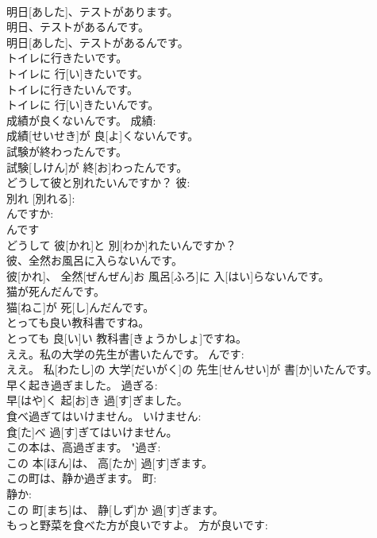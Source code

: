 \documentclass[8pt]{extreport}
\begin{document}
\begin{CJK}{UTF8}{min}
\\	明日[あした]、テストがあります。	
\\	明日、テストがあるんです。	
\\	明日[あした]、テストがあるんです。	
\\	トイレに行きたいです。	
\\	トイレに 行[い]きたいです。	
\\	トイレに行きたいんです。	
\\	トイレに 行[い]きたいんです。	
\\	成績が良くないんです。	成績: 
\\	成績[せいせき]が 良[よ]くないんです。	
\\	試験が終わったんです。	
\\	試験[しけん]が 終[お]わったんです。	
\\	どうして彼と別れたいんですか？	彼: 
\\	別れ [別れる]: 
\\	んですか: 
\\	んです 
\\	どうして 彼[かれ]と 別[わか]れたいんですか？	
\\	彼、全然お風呂に入らないんです。	
\\	彼[かれ]、 全然[ぜんぜん]お 風呂[ふろ]に 入[はい]らないんです。	
\\	猫が死んだんです。	
\\	猫[ねこ]が 死[し]んだんです。	
\\	とっても良い教科書ですね。	
\\	とっても 良[い]い 教科書[きょうかしょ]ですね。	
\\	ええ。私の大学の先生が書いたんです。	んです: 
\\	ええ。 私[わたし]の 大学[だいがく]の 先生[せんせい]が 書[か]いたんです。	
\\	早く起き過ぎました。	過ぎる: 
\\	早[はや]く 起[お]き 過[す]ぎました。	
\\	食べ過ぎてはいけません。	いけません: 
\\	食[た]べ 過[す]ぎてはいけません。	
\\	この本は、高過ぎます。	"過ぎ: 
\\	この 本[ほん]は、 高[たか] 過[す]ぎます。	
\\	この町は、静か過ぎます。	町: 
\\	静か: 
\\	この 町[まち]は、 静[しず]か 過[す]ぎます。	
\\	もっと野菜を食べた方が良いですよ。	方が良いです: 

\end{CJK}
\end{document}
